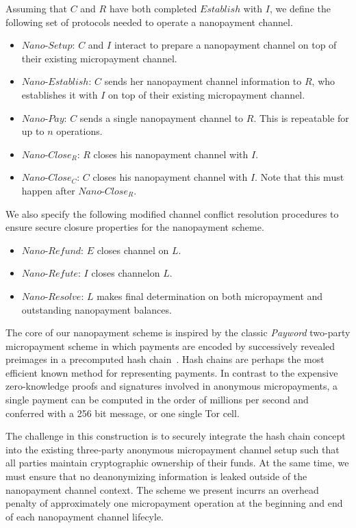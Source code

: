 Assuming that $C$ and $R$ have both completed $Establish$ with $I$, we define
the following set of protocols needed to operate a nanopayment channel.

\begin{itemize}
\item $Nano$-$Setup$: $C$ and $I$ interact to prepare a nanopayment channel on top
  of their existing micropayment channel.
\item $Nano$-$Establish$: $C$ sends her nanopayment channel information to $R$,
  who establishes it with $I$ on top of their existing micropayment channel.
\item $Nano$-$Pay$: $C$ sends a single nanopayment channel to $R$. This is
  repeatable for up to $n$ operations.
\item $Nano$-$Close_R$: $R$ closes his nanopayment channel with $I$.
\item $Nano$-$Close_C$: $C$ closes his nanopayment channel with $I$. Note that
  this must happen after $Nano$-$Close_R$.
\end{itemize}

We also specify the following modified channel conflict resolution procedures to
ensure secure closure properties for the nanopayment scheme.

\begin{itemize}
\item $Nano$-$Refund$: $E$ closes channel on $L$.
\item $Nano$-$Refute$: $I$ closes channelon $L$.
\item $Nano$-$Resolve$: $L$ makes final determination on both micropayment and
  outstanding nanopayment balances.
\end{itemize}

The core of our nanopayment scheme is inspired by the classic \emph{Payword}
two-party micropayment scheme in which payments are encoded by successively
revealed preimages in a precomputed hash chain~\cite{rivest1996payword}. Hash
chains are perhaps the most efficient known method for representing payments. In
contrast to the expensive zero-knowledge proofs and signatures involved in
anonymous micropayments, a single payment can be computed in the order of
millions per second and conferred with a 256 bit message, or one single Tor
cell.

The challenge in this construction is to securely integrate the hash chain
concept into the existing three-party anonymous micropayment channel setup such
that all parties maintain cryptographic ownership of their funds. At the same
time, we must ensure that no deanonymizing information is leaked outside of the
nanopayment channel context. The scheme we present incurrs an overhead penalty
of approximately one micropayment operation at the beginning and end of each
nanopayment channel lifecyle.

